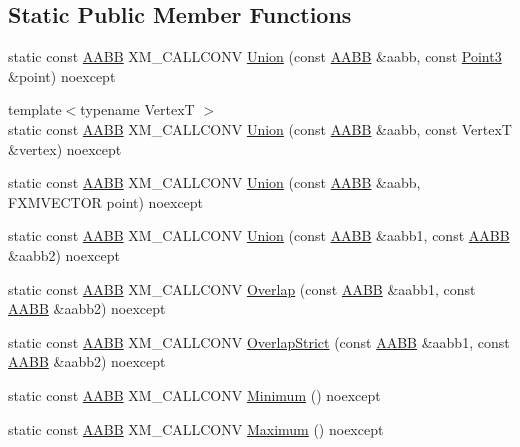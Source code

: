 \subsection*{Static Public Member Functions}
\begin{DoxyCompactItemize}
\item 
static const \hyperlink{classmage_1_1_a_a_b_b}{A\+A\+BB} X\+M\+\_\+\+C\+A\+L\+L\+C\+O\+NV \hyperlink{classmage_1_1_a_a_b_b_a24a6669f2ba170b93583bf433cb3e206}{Union} (const \hyperlink{classmage_1_1_a_a_b_b}{A\+A\+BB} \&aabb, const \hyperlink{structmage_1_1_point3}{Point3} \&point) noexcept
\item 
{\footnotesize template$<$typename VertexT $>$ }\\static const \hyperlink{classmage_1_1_a_a_b_b}{A\+A\+BB} X\+M\+\_\+\+C\+A\+L\+L\+C\+O\+NV \hyperlink{classmage_1_1_a_a_b_b_accf101a629c15d27346010c943dda069}{Union} (const \hyperlink{classmage_1_1_a_a_b_b}{A\+A\+BB} \&aabb, const VertexT \&vertex) noexcept
\item 
static const \hyperlink{classmage_1_1_a_a_b_b}{A\+A\+BB} X\+M\+\_\+\+C\+A\+L\+L\+C\+O\+NV \hyperlink{classmage_1_1_a_a_b_b_ac7359d9d73a14c0c26f8caac2a315732}{Union} (const \hyperlink{classmage_1_1_a_a_b_b}{A\+A\+BB} \&aabb, F\+X\+M\+V\+E\+C\+T\+OR point) noexcept
\item 
static const \hyperlink{classmage_1_1_a_a_b_b}{A\+A\+BB} X\+M\+\_\+\+C\+A\+L\+L\+C\+O\+NV \hyperlink{classmage_1_1_a_a_b_b_a96b3e8263d585f01a2f991b2122f8712}{Union} (const \hyperlink{classmage_1_1_a_a_b_b}{A\+A\+BB} \&aabb1, const \hyperlink{classmage_1_1_a_a_b_b}{A\+A\+BB} \&aabb2) noexcept
\item 
static const \hyperlink{classmage_1_1_a_a_b_b}{A\+A\+BB} X\+M\+\_\+\+C\+A\+L\+L\+C\+O\+NV \hyperlink{classmage_1_1_a_a_b_b_a35bf465fbd8571acc2707fa555b9245b}{Overlap} (const \hyperlink{classmage_1_1_a_a_b_b}{A\+A\+BB} \&aabb1, const \hyperlink{classmage_1_1_a_a_b_b}{A\+A\+BB} \&aabb2) noexcept
\item 
static const \hyperlink{classmage_1_1_a_a_b_b}{A\+A\+BB} X\+M\+\_\+\+C\+A\+L\+L\+C\+O\+NV \hyperlink{classmage_1_1_a_a_b_b_a43da3c0b22cd1abb9032d0fb41d4e020}{Overlap\+Strict} (const \hyperlink{classmage_1_1_a_a_b_b}{A\+A\+BB} \&aabb1, const \hyperlink{classmage_1_1_a_a_b_b}{A\+A\+BB} \&aabb2) noexcept
\item 
static const \hyperlink{classmage_1_1_a_a_b_b}{A\+A\+BB} X\+M\+\_\+\+C\+A\+L\+L\+C\+O\+NV \hyperlink{classmage_1_1_a_a_b_b_a9a2a4a236dca8479e208cd0b9ee07b9a}{Minimum} () noexcept
\item 
static const \hyperlink{classmage_1_1_a_a_b_b}{A\+A\+BB} X\+M\+\_\+\+C\+A\+L\+L\+C\+O\+NV \hyperlink{classmage_1_1_a_a_b_b_a72f4f49b07a3816ad74fde9defc8cb76}{Maximum} () noexcept
\end{DoxyCompactItemize}
